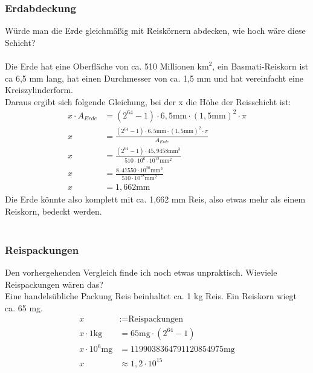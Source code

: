 \documentclass[a4paper,9pt]{scrartcl}
\begin{document}
  \subsubsection{Erdabdeckung}
    Würde man die Erde gleichmäßig mit Reiskörnern abdecken, wie hoch wäre diese
    Schicht?\\
    \\
    Die Erde hat eine Oberfläche von ca. 510 Millionen $\text{km}^2$, ein Basmati-Reiskorn
    ist ca 6,5 mm lang, hat einen Durchmesser von ca. 1,5 mm und hat vereinfacht 
    eine Kreiszylinderform.\\
    Daraus ergibt sich folgende Gleichung, bei der x die Höhe der Reisschicht 
    ist:\\
    \begin{align}
        x \cdot A_{Erde} &= (2^{64}-1) \cdot 6,5\text{mm} \cdot (1,5\text{mm})^2 \cdot \pi \\
        x &= \frac{(2^{64}-1) \cdot 6,5\text{mm} \cdot (1,5\text{mm})^2 \cdot \pi}{A_{Erde}} \\
        x &= \frac{(2^{64}-1) \cdot 45,9458\text{mm}^3}{510 \cdot 10^6 \cdot 10^{12} \text{mm}^2} \\
        x &= \frac{8,47550 \cdot 10^{20} \text{mm}^3}{510 \cdot 10^{18} \text{mm}^2} \\
        x &= 1,662\text{mm}
    \end{align}
    Die Erde könnte also komplett mit ca. 1,662 mm Reis, also etwas mehr als 
    einem Reiskorn, bedeckt werden.\\
    \\
    \subsubsection{Reispackungen}
    Den vorhergehenden Vergleich finde ich noch etwas unpraktisch. Wieviele Reispackungen 
    wären das? \\
    Eine handelsübliche Packung Reis beinhaltet ca. 1 kg Reis. Ein Reiskorn 
    wiegt ca. 65 mg.\\
    \begin{align}
        x &:= \text{Reispackungen} \\
        x \cdot 1\text{kg}     &= 65\text{mg} \cdot (2^{64}-1) \\
        x \cdot 10^6\text{mg} &= 1199038364791120854975\text{mg} \\
        x &\approx 1,2 \cdot 10^{15}
    \end{align}
\end{document}
